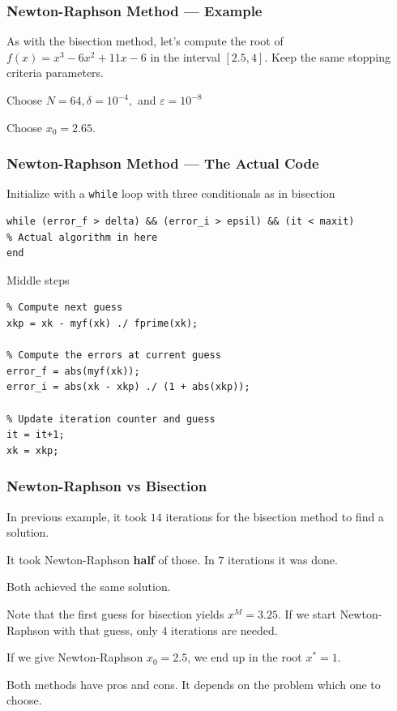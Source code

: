 \documentclass[11pt,xcolor={svgnames},aspectratio=169,usepdftitle=false]{beamer}
\let\toneitemize\itemize
\let\ttwoitemize\enditemize
\renewenvironment{itemize}{\toneitemize\addtolength{\itemsep}{0.7\baselineskip}}{\ttwoitemize}
\let\toneenumer\enumerate
\let\ttwoenumer\endenumerate
\renewenvironment{enumerate}{\toneenumer\addtolength{\itemsep}{0.7\baselineskip}}{\ttwoenumer}
\begin{document}
\begin{frame}
  \frametitle{Newton-Raphson Method --- Example}
As with the bisection method, let's compute the root of $f(x) = x^3 - 6x^2 + 11x - 6$ in the interval $[2.5, 4]$. Keep the same stopping criteria parameters.
\begin{enumerate}
  \item Choose $N = 64, \delta = 10^{-4},$ and $\varepsilon = 10^{-8}$
  \item Choose $x_0 = 2.65$.
\end{enumerate}
\end{frame}

\begin{frame}[fragile]
  \frametitle{Newton-Raphson Method --- The Actual Code}
  \begin{itemize}
    \item Initialize with a \verb;while; loop with three conditionals as in bisection
\begin{lstlisting}
while (error_f > delta) && (error_i > epsil) && (it < maxit)
% Actual algorithm in here
end     
\end{lstlisting}
    \item Middle steps
\begin{lstlisting}
% Compute next guess
xkp = xk - myf(xk) ./ fprime(xk);
    
% Compute the errors at current guess
error_f = abs(myf(xk));
error_i = abs(xk - xkp) ./ (1 + abs(xkp));

% Update iteration counter and guess
it = it+1;
xk = xkp;
\end{lstlisting}
\end{itemize}
\end{frame}

\begin{frame}
  \frametitle{Newton-Raphson vs Bisection}
\begin{itemize}
  \item In previous example, it took $14$ iterations for the bisection method to find a solution.
  \item It took Newton-Raphson \alert{\textbf{half}} of those. In $7$ iterations it was done.
  \item Both achieved the same solution.
  \item Note that the first guess for bisection yields $x^M = 3.25$. If we start Newton-Raphson with that guess, only $4$ iterations are needed.
  \item If we give Newton-Raphson $x_0 = 2.5$, we end up in the root $x^* = 1$.
  \item Both methods have pros and cons. It depends on the problem which one to choose.
\end{itemize}
\end{frame}
\end{document}
